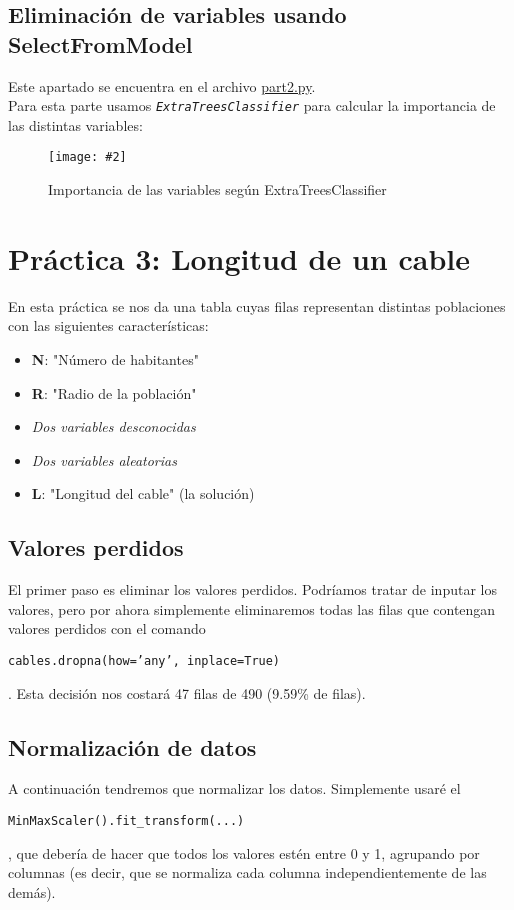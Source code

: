 \documentclass[
12pt, 
spanish, 
singlespacing,
headsepline
]{article}
\newcommand{\smallimage}[2]{
\begin{figure}[H]
	\caption{#1}
	\centering
	\texttt{[image: \#2]}
\end{figure}
}
\newcommand{\code}[1]{\colorbox{light-gray}{\parbox{\dimexpr\linewidth-2\fboxsep}{\strut  \texttt{#1}\strut}}}
\begin{document}
\subsection{Eliminación de variables usando SelectFromModel}
Este apartado se encuentra en el archivo \href{https://github.com/uo272509/InteligenciaNegocioPL/blob/7f59f8fb2b83986595ab9083fa9a6d28ed39c67c/Prac2/part2.py}{part2.py}.\\

Para esta parte usamos \texttt{\textit{ExtraTreesClassifier}} para calcular la importancia de las distintas variables:
\smallimage{Importancia de las variables según ExtraTreesClassifier}{pl2/Figure_8.png}


\section{Práctica 3: Longitud de un cable}
En esta práctica se nos da una tabla cuyas filas representan distintas poblaciones con las siguientes características:
\begin{itemize}
\item \textbf{N}: "Número de habitantes"
\item \textbf{R}: "Radio de la población"
\item \textit{Dos variables desconocidas}
\item \textit{Dos variables aleatorias}
\item \textbf{L}: "Longitud del cable" (la solución)
\end{itemize}

\subsection{Valores perdidos}
El primer paso es eliminar los valores perdidos. Podríamos tratar de inputar los valores, pero por ahora simplemente eliminaremos todas las filas que contengan valores perdidos con el comando \code{cables.dropna(how='any', inplace=True)}. Esta decisión nos costará 47 filas de 490 (9.59\% de filas).

\subsection{Normalización de datos}
A continuación tendremos que normalizar los datos. Simplemente usaré el \code{MinMaxScaler().fit_transform(...)}, que debería de hacer que todos los valores estén entre 0 y 1, agrupando por columnas (es decir, que se normaliza cada columna independientemente de las demás).
\end{document}
